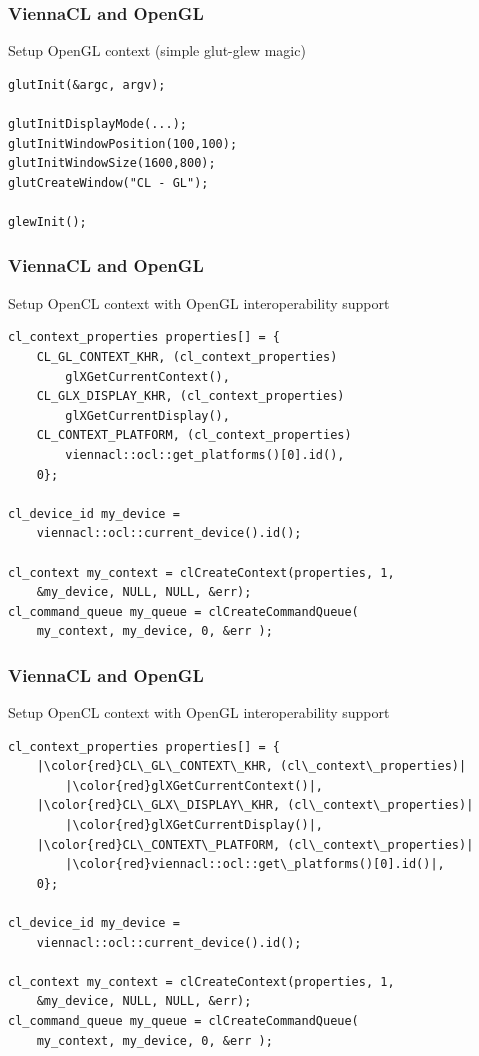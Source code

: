 \begin{frame}[fragile]
\frametitle{ViennaCL and OpenGL}

\begin{block}{Setup OpenGL context (simple glut-glew magic)}
  \begin{lstlisting}
glutInit(&argc, argv);
    
glutInitDisplayMode(...);
glutInitWindowPosition(100,100);
glutInitWindowSize(1600,800);
glutCreateWindow("CL - GL");
    
glewInit();
  \end{lstlisting}
\end{block}

\end{frame}



\begin{frame}[fragile]
\frametitle{ViennaCL and OpenGL}

\begin{block}{Setup OpenCL context with OpenGL interoperability support}
  \begin{lstlisting}
cl_context_properties properties[] = {
    CL_GL_CONTEXT_KHR, (cl_context_properties)
        glXGetCurrentContext(),
    CL_GLX_DISPLAY_KHR, (cl_context_properties)
        glXGetCurrentDisplay(),
    CL_CONTEXT_PLATFORM, (cl_context_properties)
        viennacl::ocl::get_platforms()[0].id(),
    0};
    
cl_device_id my_device =
    viennacl::ocl::current_device().id();
        
cl_context my_context = clCreateContext(properties, 1,
    &my_device, NULL, NULL, &err);
cl_command_queue my_queue = clCreateCommandQueue(
    my_context, my_device, 0, &err );
  \end{lstlisting}
\end{block}

\end{frame}


\begin{frame}[fragile]
\frametitle{ViennaCL and OpenGL}

\begin{block}{Setup OpenCL context with OpenGL interoperability support}
  \begin{lstlisting}
cl_context_properties properties[] = {
    |\color{red}CL\_GL\_CONTEXT\_KHR, (cl\_context\_properties)|
        |\color{red}glXGetCurrentContext()|,
    |\color{red}CL\_GLX\_DISPLAY\_KHR, (cl\_context\_properties)|
        |\color{red}glXGetCurrentDisplay()|,
    |\color{red}CL\_CONTEXT\_PLATFORM, (cl\_context\_properties)|
        |\color{red}viennacl::ocl::get\_platforms()[0].id()|,
    0};
    
cl_device_id my_device =
    viennacl::ocl::current_device().id();
        
cl_context my_context = clCreateContext(properties, 1,
    &my_device, NULL, NULL, &err);
cl_command_queue my_queue = clCreateCommandQueue(
    my_context, my_device, 0, &err );
  \end{lstlisting}
\end{block}

\end{frame}



